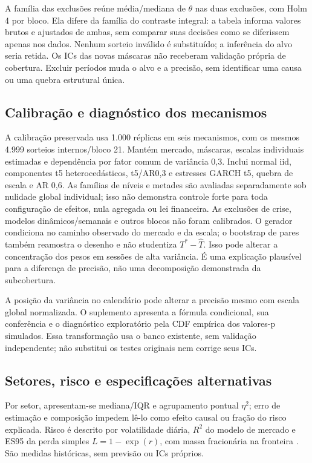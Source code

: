 A família das exclusões reúne média/mediana de $\theta $ nas duas exclusões,
com Holm 4 por bloco. Ela difere da família do contraste integral: a tabela
informa valores brutos e ajustados de ambas, sem comparar suas decisões
como se diferissem apenas nos dados. Nenhum sorteio inválido é substituído;
a inferência do alvo seria retida. Os ICs das novas máscaras não
receberam validação própria de cobertura. Excluir períodos muda o alvo
e a precisão, sem identificar uma causa ou uma quebra estrutural única.

\subsection{Calibração e diagnóstico dos mecanismos}
\label{sec:calibracao}
A calibração preservada usa 1.000 réplicas em seis mecanismos, com os
mesmos 4.999 sorteios internos/bloco 21. Mantém mercado, máscaras,
escalas individuais estimadas e dependência por fator comum de variância 0,3.
Inclui normal iid, componentes t5 heterocedásticos, t5/AR0,3 e estresses
GARCH t5, quebra de escala e AR 0,6. As famílias de níveis e metades são avaliadas
separadamente sob nulidade global individual; isso não demonstra controle
forte para toda configuração de efeitos, nula agregada ou lei financeira.
As exclusões de crise, modelos dinâmicos/semanais e outros blocos não foram calibrados.
O gerador condiciona no caminho observado do mercado e da escala;
o bootstrap de pares também reamostra o desenho e não studentiza
$T^*-\widehat T$. Isso pode alterar a concentração dos pesos em
sessões de alta variância. É uma explicação plausível para a diferença
de precisão, não uma decomposição demonstrada da subcobertura.


A posição da variância no calendário pode alterar a precisão mesmo com
escala global normalizada. O suplemento apresenta a fórmula condicional,
sua conferência e o diagnóstico exploratório pela CDF empírica dos
valores-p simulados. Essa transformação usa o banco existente, sem validação
independente; não substitui os testes originais nem corrige seus ICs.

\subsection{Setores, risco e especificações alternativas}
Por setor, apresentam-se mediana/IQR e agrupamento pontual $\eta^2$;
erro de estimação e composição impedem lê-lo como efeito causal ou
fração do risco explicada. Risco é descrito por volatilidade diária,
$R^2$ do modelo de mercado e ES95 da perda simples $L=1-\exp(r)$,
com massa fracionária na fronteira \cite{rockafellar1999}. São medidas
históricas, sem previsão ou ICs próprios.

